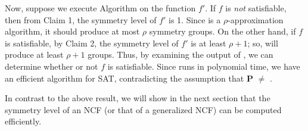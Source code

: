 \medskip
 
Now, suppose we execute Algorithm \cala{} on the function $f'$.
If $f$ is \emph{not} satisfiable, then from Claim 1, 
the symmetry level of $f'$ is 1. 
Since \cala{} is a $\rho$-approximation algorithm,
it should produce at most $\rho$ symmetry groups.
On the other hand, if $f$ is satisfiable, by Claim 2, the symmetry
level of $f'$ is at least $\rho+1$; so, \cala{} will produce at least
$\rho+1$ groups.
Thus, by examining the output of \cala, we can determine whether or not $f$
is satisfiable.
Since \cala{} runs in polynomial time, we have an efficient 
algorithm for SAT, contradicting the assumption that \textbf{P} $\neq$ \cnp.
\QED

\medskip

In contrast to the above result,
we will show in the next section that the symmetry level 
of an NCF (or that of a
generalized NCF) can be computed efficiently.

